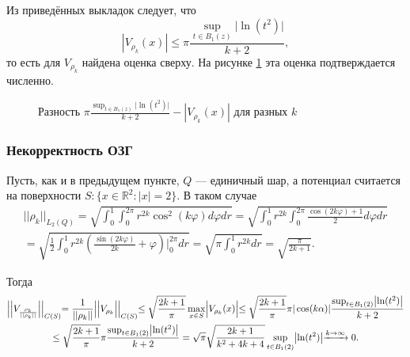 \documentclass[a4paper]{article}
\newcommand{\R}[1]{\mathbb{R}^#1}
\begin{document}
Из приведённых выкладок следует, что 
\begin{equation}
   | V_{\rho_k}(x)| \leq \pi \frac{\sup_{t \in B_1(z)} \bigl| \ln (t^2) \bigl|}{k+2},
\end{equation}
то есть для $V_{\rho_k}$ найдена оценка сверху. На рисунке \ref{chis} эта оценка подтверждается численно.
\begin{figure}[h!]
  \noindent{}
  \caption{Разность $\pi \frac{\sup_{t \in B_1(z)} \bigl| \ln (t^2) \bigl|}{k+2} -| V_{\rho_k}(x)| $ для разных $k$}
  \label{chis}
  \end{figure} 

\subsubsection{Некорректность ОЗГ}
Пусть, как и в предыдущем пункте, $Q$ --- единичный шар, а потенциал считается на поверхности $S: \{x\in \R{2}: |x|=2 \}$. В таком случае
\begin{multline}
    ||\rho_k ||_{L_2(Q)}=\sqrt{\int_0^1 \int_0^{2 \pi} r^{2k} \cos^2(k \varphi) d\varphi dr}= \sqrt{\int_0^1 r^{2k} \int_0^{2 \pi} \frac{\cos(2k \varphi)+1}{2}  d\varphi dr}\\
    =\sqrt{\frac{1}{2} \int_0^1 r^{2k} \left( \frac{\sin(2k \varphi)}{2k} +\varphi\right)\Biggl|_0^{2 \pi} dr}= \sqrt{\pi \int_0^1 r^{2k} dr}=\sqrt{\frac{\pi}{2k+1}}.
\end{multline}

Тогда
\begin{multline}
    \Bigl|\Bigl|V_{\frac{\rho_k}{||\rho_k ||}}  \Bigl|\Bigl|_{C(S)}= \frac{1}{||\rho_k ||} \Bigl|\Bigl|V_{\rho_k}  \Bigl|\Bigl|_{C(S)} \leq \sqrt{\frac{2k+1}{\pi}} \max_{x \in S} \Bigl| V_{\rho_k}(x) \Bigl| \leq \sqrt{\frac{2k+1}{\pi}} \pi |\cos(k\alpha)| \frac{\sup_{t \in B_1(2)} \bigl| \ln (t^2) \bigl|}{k+2} \\
    \leq \sqrt{\frac{2k+1}{\pi}} \pi \frac{\sup_{ t \in B_1(2)} \bigl| \ln (t^2) \bigl|}{k+2} = \sqrt{\pi} \sqrt{\frac{2k+1}{k^2 + 4k+4}}\sup_{t \in B_1(2)} \bigl| \ln (t^2) \bigl| \xrightarrow{k \rightarrow \infty} 0.
\end{multline}
\end{document}
